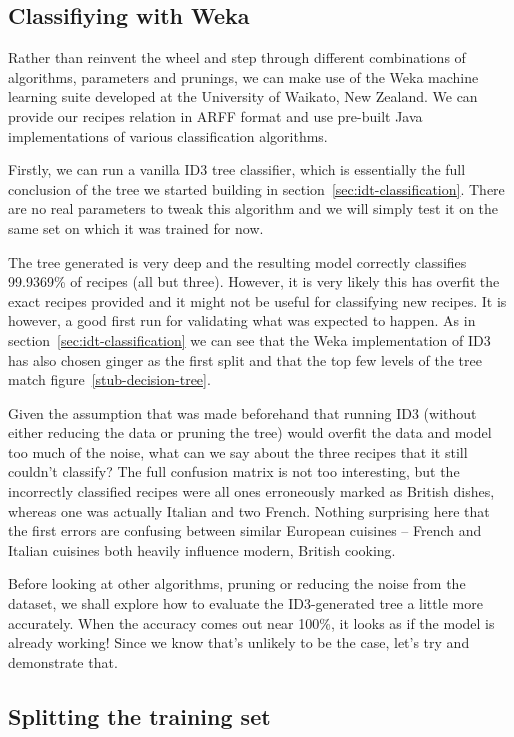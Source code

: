 \documentclass[11pt,a4paper]{article}
\begin{document}
\subsection{Classifiying with Weka}
\label{sec:weka}

Rather than reinvent the wheel and step through different combinations
of algorithms, parameters and prunings, we can make use of the Weka \cite{witten2011data}
machine learning suite developed at the University of Waikato, New Zealand.
We can provide our recipes relation in ARFF format and use pre-built Java
implementations of various classification algorithms.

Firstly, we can run a vanilla ID3 tree classifier, which is essentially the full
conclusion of the tree we started building in section~\ref{sec:idt-classification}.
There are no real parameters to tweak this algorithm and we will simply test it on the
same set on which it was trained for now.

The tree generated is very deep and the resulting model correctly classifies 99.9369\%
of recipes (all but three). However, it is very likely this has overfit the exact
recipes provided and it might not be useful for classifying new recipes. It is
however, a good first run for validating what was expected to happen. As in
section~\ref{sec:idt-classification} we can see that the Weka implementation of ID3
has also chosen ginger as the first split and that the top few levels
of the tree match figure~\ref{stub-decision-tree}.

Given the assumption that was made beforehand that running ID3
(without either reducing the data or pruning the tree) would overfit the
data and model too much of the noise, what can we say about the three recipes that it
still couldn't classify? The full confusion matrix is not too interesting, but
the incorrectly classified recipes were all ones erroneously marked as British
dishes, whereas one was actually Italian and two French. Nothing surprising here
that the first errors are confusing between similar European cuisines -- French and
Italian cuisines both heavily influence modern, British cooking.

Before looking at other algorithms, pruning or reducing the noise from the dataset,
we shall explore how to evaluate the ID3-generated tree a little more accurately.
When the accuracy comes out near 100\%, it looks as if the model is already working!
Since we know that's unlikely to be the case, let's try and demonstrate that.

\subsection{Splitting the training set}
\end{document}
